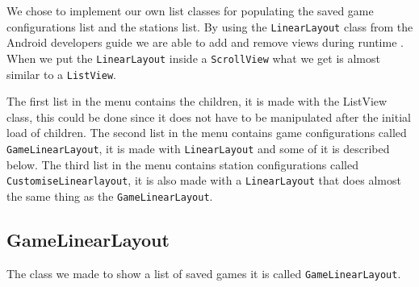 We chose to implement our own list classes for populating the saved game configurations list and the stations list. By using the \lstinline|LinearLayout| class from the Android developers guide we are able to add and remove views during runtime \citep{androidlayouts}. When we put the \lstinline|LinearLayout| inside a \lstinline|ScrollView| what we get is almost similar to a \lstinline|ListView|.

The first list in the menu contains the children, it is made with the ListView class, this could be done since it does not have to be manipulated after the initial load of children. The second list in the menu contains game configurations called \lstinline|GameLinearLayout|, it is made with \lstinline|LinearLayout| and some of it is described below. The third list in the menu contains station configurations called \lstinline|CustomiseLinearlayout|, it is also made with a \lstinline|LinearLayout| that does almost the same thing as the \lstinline|GameLinearLayout|.

\subsection*{GameLinearLayout}

The class we made to show a list of saved games it is called \lstinline|GameLinearLayout|.

